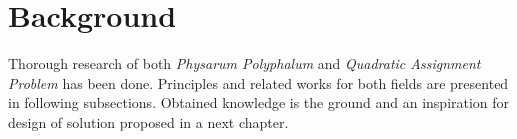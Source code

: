 \chapter{Background}
\label{chapter:background}

Thorough research of both \textit{Physarum Polyphalum} and \textit{Quadratic Assignment Problem} has been done. Principles and related works for both fields are presented in following subsections. Obtained knowledge is the ground and an inspiration for design of solution proposed in a next chapter.





